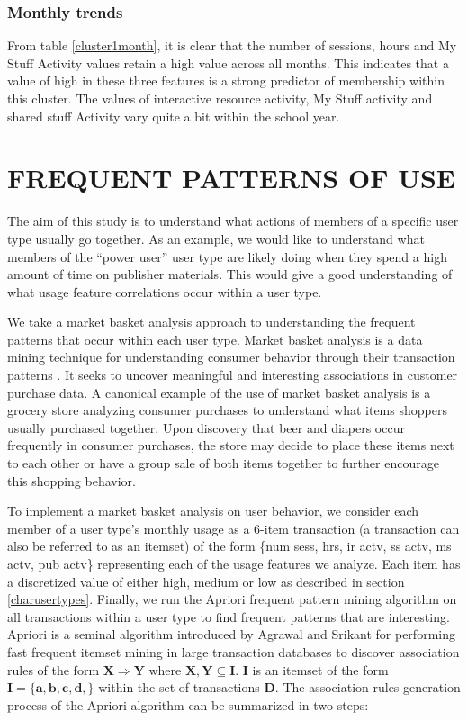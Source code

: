 \documentclass{acm_proc_article-sp}
\begin{document}
\subsubsection{Monthly trends}
From table \ref{cluster1month}, it is clear that the number of sessions, hours and My Stuff Activity values retain a high value across all months. This indicates that a value of high in these three features is a strong predictor of membership within this cluster.  The values of interactive resource activity, My Stuff activity and shared stuff Activity vary quite a bit within the school year.

\section{FREQUENT PATTERNS OF USE}
The aim of this study is to understand what actions of members of a specific user type usually go together. As an example, we would like to understand what members of the ``power user'' user type are likely doing when they spend a high amount of time on publisher materials. This would give a good understanding of what usage feature correlations occur within a user type.

We take a market basket analysis approach to understanding the frequent patterns that occur within each user type. Market basket analysis is a data mining technique for understanding consumer behavior through their transaction patterns \cite{han2006data}. It seeks to uncover meaningful and interesting associations in customer purchase data. A canonical example of the use of  market basket analysis is a grocery store analyzing consumer purchases to understand what items shoppers usually purchased together. Upon discovery that beer and diapers occur frequently in consumer purchases, the store may decide to place these items next to each other or have a group sale of both items together to further encourage this shopping behavior.

To implement a market basket analysis on user behavior, we consider each member of a user type's monthly usage as a 6-item transaction (a transaction can also be referred to as an itemset) of the form \{num sess, hrs, ir actv, ss actv, ms actv, pub actv\} representing each of the usage features we analyze. Each item has a discretized value of either high, medium or low as described in section \ref{charusertypes}. Finally, we run the Apriori frequent pattern mining algorithm on all transactions within a user type to find frequent patterns that are interesting. Apriori is a seminal algorithm introduced by Agrawal and Srikant \cite{agrawal} for performing fast frequent itemset mining in large transaction databases to discover association rules of the form $\mathbf{{X} \Longrightarrow {Y}}$ where $\mathbf{X, Y \subseteq I}$. $\mathbf{I}$ is an itemset of the form $\mathbf{I = \{a,b,c,d,\}}$ within the set of transactions $\mathbf{D}$.
The association rules generation process of the Apriori algorithm can be summarized in two steps:
\end{document}
